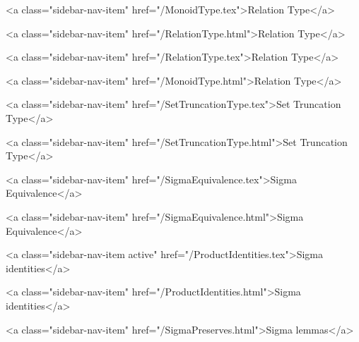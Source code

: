       
    
      
        
          <a class="sidebar-nav-item" href="/MonoidType.tex">Relation Type</a>
        
      
    
      
        
          <a class="sidebar-nav-item" href="/RelationType.html">Relation Type</a>
        
      
    
      
        
          <a class="sidebar-nav-item" href="/RelationType.tex">Relation Type</a>
        
      
    
      
        
          <a class="sidebar-nav-item" href="/MonoidType.html">Relation Type</a>
        
      
    
      
        
          <a class="sidebar-nav-item" href="/SetTruncationType.tex">Set Truncation Type</a>
        
      
    
      
        
          <a class="sidebar-nav-item" href="/SetTruncationType.html">Set Truncation Type</a>
        
      
    
      
        
          <a class="sidebar-nav-item" href="/SigmaEquivalence.tex">Sigma Equivalence</a>
        
      
    
      
        
          <a class="sidebar-nav-item" href="/SigmaEquivalence.html">Sigma Equivalence</a>
        
      
    
      
        
          <a class="sidebar-nav-item active" href="/ProductIdentities.tex">Sigma identities</a>
        
      
    
      
        
          <a class="sidebar-nav-item" href="/ProductIdentities.html">Sigma identities</a>
        
      
    
      
        
          <a class="sidebar-nav-item" href="/SigmaPreserves.html">Sigma lemmas</a>
        
